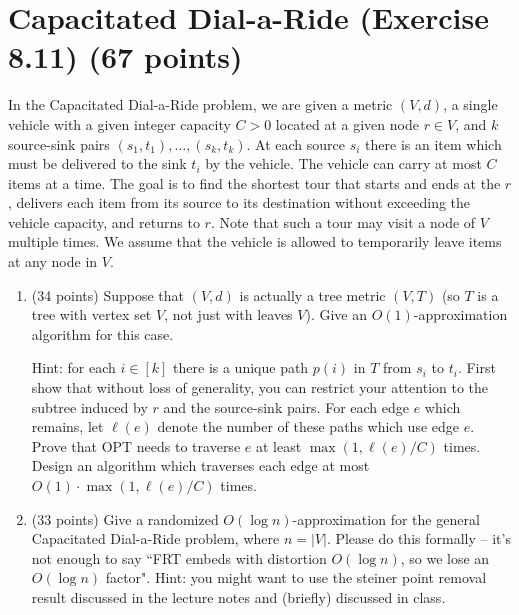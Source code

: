 \documentclass[11pt]{article}
\begin{document}
\section{Capacitated Dial-a-Ride (Exercise 8.11) (67 points)}
In the Capacitated Dial-a-Ride problem, we are given a metric $(V, d)$, a single vehicle with a given integer capacity $C > 0$ located at a given node $r \in V$, and $k$ source-sink pairs $(s_1, t_1), \dots, (s_k, t_k)$.  At each source $s_i$ there is an item which must be delivered to the sink $t_i$ by the vehicle. The vehicle can carry at most $C$ items at a time.  The goal is to find the shortest tour that starts and ends at the $r$, delivers each item from its source to its destination without exceeding the vehicle capacity, and returns to $r$.  Note that such a tour may visit a node of $V$ multiple times.  We assume that the vehicle is allowed to temporarily leave items at any node in $V$.

\begin{enumerate}
\item (34 points) Suppose that $(V, d)$ is actually a tree metric $(V, T)$ (so $T$ is a tree with vertex set $V$, not just with leaves $V$).  Give an $O(1)$-approximation algorithm for this case.  

Hint:  for each $i \in [k]$ there is a unique path $p(i)$ in $T$ from $s_i$ to $t_i$.  First show that without loss of generality, you can restrict your attention to the subtree induced by $r$ and the source-sink pairs.  For each edge $e$ which remains, let $\ell(e)$ denote the number of these paths which use edge $e$.  Prove that OPT needs to traverse $e$ at least $\max(1,\ell(e) / C)$ times.  Design an algorithm which traverses each edge at most $O(1) \cdot \max(1,\ell(e) / C)$ times.  

\item (33 points) Give a randomized $O(\log n)$-approximation for the general Capacitated Dial-a-Ride problem, where $n = |V|$.  Please do this formally -- it's not enough to say ``FRT embeds with distortion $O(\log n)$, so we lose an $O(\log n)$ factor".  Hint: you might want to use the steiner point removal result discussed in the lecture notes and (briefly) discussed in class.

\end{enumerate}
\end{document}
